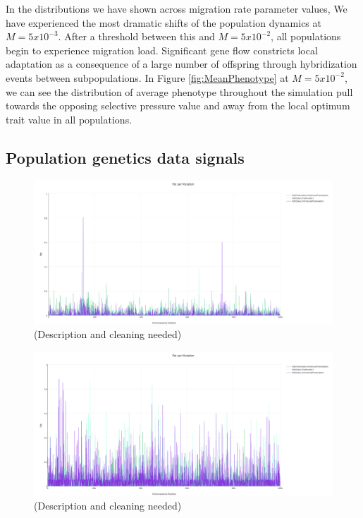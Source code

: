 \documentclass{article}
\begin{document}

In the distributions we have shown across migration rate parameter values, 
We have experienced the most dramatic shifts of the population dynamics at $M = 5x10^{-3}$.
After a threshold between this and $M = 5x10^{-2}$, all populations begin to experience migration load. 
Significant gene flow constricts local adaptation
as a consequence of a large number of offspring through hybridization events between subpopulations.
In Figure \ref{fig:MeanPhenotype} at $M = 5x10^{-2}$, we can see the distribution of average phenotype throughout the simulation
pull towards the opposing selective pressure value and away from the local optimum trait value in all populations.



\subsection*{Population genetics data signals}


\begin{figure}
	\begin{center}
  		\includegraphics[width=0.7\linewidth]{plotlyPlots/FstAcross5e-3.png}
  		\caption{(Description and cleaning needed)
		}
  		\label{fig:Fst3}
	\end{center}
\end{figure}

\begin{figure}
	\begin{center}
  		\includegraphics[width=0.7\linewidth]{plotlyPlots/FstAcross5e-4.png}
  		\caption{(Description and cleaning needed)
		}
  		\label{fig:Fst2}
	\end{center}
\end{figure}
\end{document}

